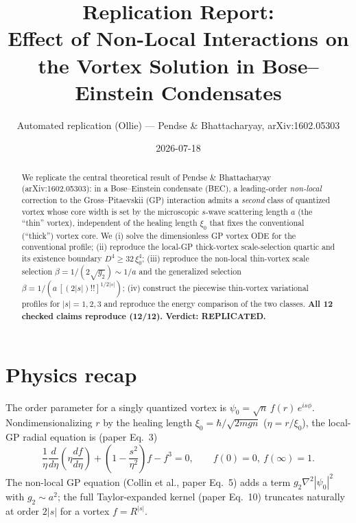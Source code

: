 \documentclass[11pt]{article}
\title{Replication Report: \\ Effect of Non-Local Interactions on the Vortex Solution in Bose--Einstein Condensates}
\author{Automated replication (Ollie) --- Pendse \& Bhattacharyay, arXiv:1602.05303}
\date{2026-07-18}
\begin{document}
\maketitle

\begin{abstract}
We replicate the central theoretical result of Pendse \& Bhattacharyay
(arXiv:1602.05303): in a Bose--Einstein condensate (BEC), a leading-order
\emph{non-local} correction to the Gross--Pitaevskii (GP) interaction admits a
\emph{second} class of quantized vortex whose core width is set by the
microscopic $s$-wave scattering length $a$ (the ``thin'' vortex), independent of
the healing length $\xi_0$ that fixes the conventional (``thick'') vortex core.
We (i) solve the dimensionless GP vortex ODE for the conventional profile;
(ii) reproduce the local-GP thick-vortex scale-selection quartic and its
existence boundary $D^4 \ge 32\,\xi_0^4$; (iii) reproduce the non-local
thin-vortex scale selection $\beta = 1/(2\sqrt{g_2}) \sim 1/a$ and the
generalized selection $\beta = 1/(a\,[(2|s|)!!]^{1/2|s|})$; (iv) construct the
piecewise thin-vortex variational profiles for $|s|=1,2,3$ and reproduce the
energy comparison of the two classes. \textbf{All 12 checked claims reproduce
(12/12). Verdict: REPLICATED.}
\end{abstract}

\section{Physics recap}
The order parameter for a singly quantized vortex is $\psi_0 = \sqrt{n}\,f(r)\,e^{is\phi}$.
Nondimensionalizing $r$ by the healing length $\xi_0 = \hbar/\sqrt{2mgn}$ ($\eta = r/\xi_0$),
the local-GP radial equation is (paper Eq.~3)
\begin{equation}
\frac{1}{\eta}\frac{d}{d\eta}\!\left(\eta\frac{df}{d\eta}\right)
+\left(1-\frac{s^2}{\eta^2}\right)f - f^3 = 0,
\qquad f(0)=0,\ f(\infty)=1 .
\label{eq:gp}
\end{equation}
The non-local GP equation (Collin et al., paper Eq.~5) adds a term
$g_2\nabla^2|\psi_0|^2$ with $g_2 \sim a^2$; the full Taylor-expanded kernel
(paper Eq.~10) truncates naturally at order $2|s|$ for a vortex $f=R^{|s|}$.
\end{document}
